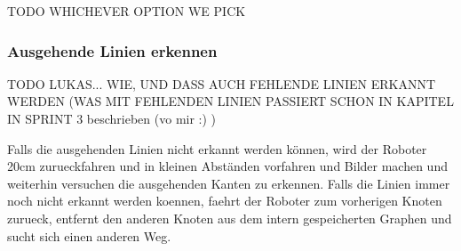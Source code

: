 TODO WHICHEVER OPTION WE PICK




\subsubsection{Ausgehende Linien erkennen}
\label{outgoing-lines}

TODO LUKAS... WIE, UND DASS AUCH FEHLENDE LINIEN ERKANNT WERDEN (WAS MIT FEHLENDEN LINIEN PASSIERT SCHON IN KAPITEL IN SPRINT 3 beschrieben (vo mir :) )

Falls die ausgehenden Linien nicht erkannt werden können, wird der Roboter 20cm zurueckfahren und in kleinen Abständen vorfahren und Bilder machen und weiterhin versuchen die ausgehenden Kanten zu erkennen. Falls die Linien immer noch nicht erkannt werden koennen, faehrt der Roboter zum vorherigen Knoten zurueck, entfernt den anderen Knoten aus dem intern gespeicherten Graphen und sucht sich einen anderen Weg.
